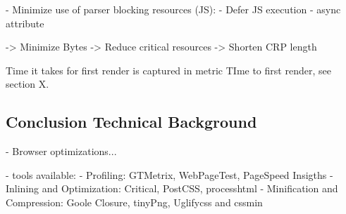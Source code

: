 	- Minimize use of parser blocking resources (JS):
		- Defer JS execution
		- async attribute


	-> Minimize Bytes
	-> Reduce critical resources
	-> Shorten CRP length







Time it takes for first render is captured in metric TIme to first render, see section X.













\subsection{Conclusion Technical Background}







- Browser optimizations...

- tools available:
- Profiling: GTMetrix, WebPageTest, PageSpeed Insigths
- Inlining and Optimization: Critical, PostCSS, processhtml
- Minification and Compression: Goole Closure, tinyPng, Uglifycss and cssmin













